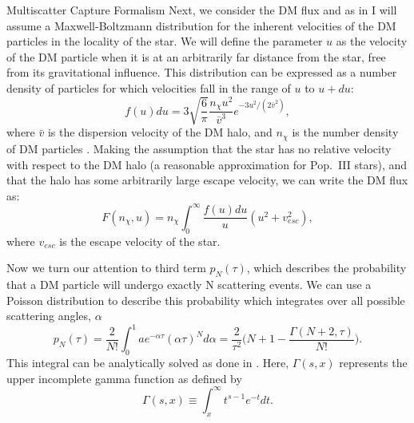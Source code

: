 \documentclass[a4paper,11pt]{article}
\newcommand{\vbar}{\bar{v}}
\begin{document}
\begin{section}{Multiscatter Capture Formalism}
    Next, we consider the DM flux and as in \cite{Bramante:2017} I will assume a Maxwell-Boltzmann distribution for the inherent velocities of the DM particles in the locality of the star.
    We will define the parameter $u$ as the velocity of the DM particle when it is at an arbitrarily far distance from the star, free from its gravitational influence.
    This distribution can be expressed as a number density of particles for which velocities fall in the range of $u$ to $u+du$:
    \begin{equation}
    f(u)du = 3\sqrt{\frac{6}{\pi}} \frac{n_{\chi}u^2}{\vbar^3} e^{-3u^2/(2\vbar^2)},
    \end{equation}
    where $\vbar$ is the dispersion velocity of the DM halo, and $n_{\chi}$ is the number density of DM particles \cite{Bramante:2017}.
    Making the assumption that the star has no relative velocity with respect to the DM halo (a reasonable approximation for Pop.~III stars), and that the halo has some arbitrarily large escape velocity, we can write the DM flux as:
    \begin{equation}
    F(n_{\chi}, u) =n_{\chi} \int_{0}^{\infty} \frac{f(u)du}{u} (u^2 + v^2_{esc}),
    \end{equation}
    where $v_{esc}$ is the escape velocity of the star.

    Now we turn our attention to third term $p_N(\tau)$, which describes the probability that a DM particle will undergo exactly N scattering events.
    We can use a Poisson distribution to describe this probability which integrates over all possible scattering angles, $\alpha$
    \begin{equation}
        p_N(\tau) = \frac{2}{N!}\int_{0}^{1} ae^{-\alpha \tau} (\alpha \tau )^N d\alpha = \frac{2}{\tau^2}\Big(N + 1 - \frac{\Gamma(N + 2, \tau)}{N!} \Big).
        \label{pnt}
    \end{equation}
    This integral can be analytically solved as done in \cite{Bramante:2017} \cite{Ilie:2019}. Here, $\Gamma(s,x)$ represents the upper incomplete gamma function as defined by
    \begin{equation}
        \Gamma(s,x) \equiv \int^\infty_x t^{s-1} e^{-t} dt .
    \end{equation}


\end{section}
\end{document}
